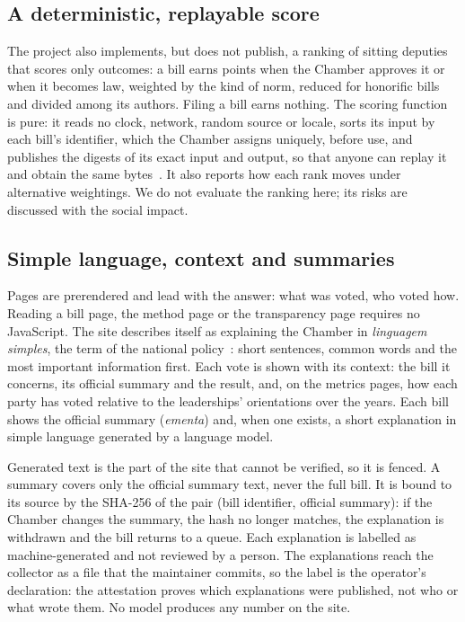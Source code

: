 \subsection{A deterministic, replayable score}
\label{sec:quality}

The project also implements, but does not publish, a ranking of sitting deputies that scores only outcomes: a bill earns points when the Chamber approves it or when it becomes law, weighted by the kind of norm, reduced for honorific bills and divided among its authors. Filing a bill earns nothing. The scoring function is pure: it reads no clock, network, random source or locale, sorts its input by each bill's identifier, which the Chamber assigns uniquely, before use, and publishes the digests of its exact input and output, so that anyone can replay it and obtain the same bytes~\citep{peng2011reproducible,lamb2022reproducible}. It also reports how each rank moves under alternative weightings. We do not evaluate the ranking here; its risks are discussed with the social impact.

\subsection{Simple language, context and summaries}
\label{sec:plain}

Pages are prerendered and lead with the answer: what was voted, who voted how. Reading a bill page, the method page or the transparency page requires no JavaScript. The site describes itself as explaining the Chamber in \emph{linguagem simples}, the term of the national policy~\citep{brasil2025lei15263}: short sentences, common words and the most important information first. Each vote is shown with its context: the bill it concerns, its official summary and the result, and, on the metrics pages, how each party has voted relative to the leaderships' orientations over the years. Each bill shows the official summary (\emph{ementa}) and, when one exists, a short explanation in simple language generated by a language model.

Generated text is the part of the site that cannot be verified, so it is fenced. A summary covers only the official summary text, never the full bill. It is bound to its source by the SHA-256 of the pair (bill identifier, official summary): if the Chamber changes the summary, the hash no longer matches, the explanation is withdrawn and the bill returns to a queue. Each explanation is labelled as machine-generated and not reviewed by a person. The explanations reach the collector as a file that the maintainer commits, so the label is the operator's declaration: the attestation proves which explanations were published, not who or what wrote them. No model produces any number on the site.

